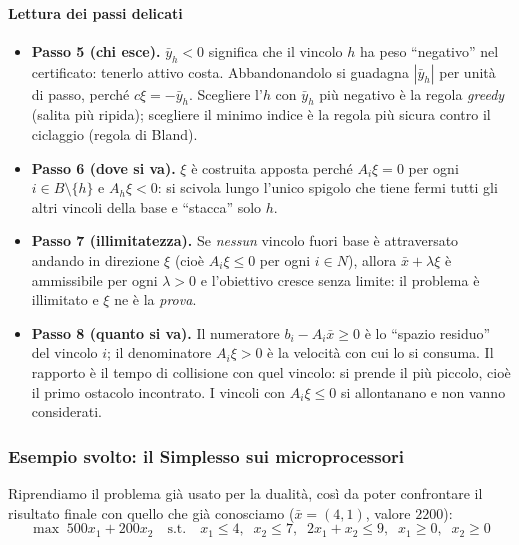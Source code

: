 \documentclass[12pt]{extarticle} %
\begin{document}
\paragraph{Lettura dei passi delicati}
\begin{itemize}
    \item \textbf{Passo 5 (chi esce).} $\bar{y}_h < 0$ significa che il vincolo $h$ ha peso ``negativo'' nel certificato: tenerlo attivo costa. Abbandonandolo si guadagna $|\bar{y}_h|$ per unità di passo, perché $c\xi = -\bar{y}_h$. Scegliere l'$h$ con $\bar{y}_h$ più negativo è la regola \emph{greedy} (salita più ripida); scegliere il minimo indice è la regola più sicura contro il ciclaggio (regola di Bland).
    \item \textbf{Passo 6 (dove si va).} $\xi$ è costruita apposta perché $A_i\xi = 0$ per ogni $i \in B\setminus\{h\}$ e $A_h\xi < 0$: si scivola lungo l'unico spigolo che tiene fermi tutti gli altri vincoli della base e ``stacca'' solo $h$.
    \item \textbf{Passo 7 (illimitatezza).} Se \emph{nessun} vincolo fuori base è attraversato andando in direzione $\xi$ (cioè $A_i\xi \le 0$ per ogni $i \in N$), allora $\bar{x} + \lambda\xi$ è ammissibile per ogni $\lambda > 0$ e l'obiettivo cresce senza limite: il problema è illimitato e $\xi$ ne è la \emph{prova}.
    \item \textbf{Passo 8 (quanto si va).} Il numeratore $b_i - A_i\bar{x} \ge 0$ è lo ``spazio residuo'' del vincolo $i$; il denominatore $A_i\xi > 0$ è la velocità con cui lo si consuma. Il rapporto è il tempo di collisione con quel vincolo: si prende il più piccolo, cioè il primo ostacolo incontrato. I vincoli con $A_i\xi \le 0$ si allontanano e non vanno considerati.
\end{itemize}

\subsubsection{Esempio svolto: il Simplesso sui microprocessori}
Riprendiamo il problema già usato per la dualità, così da poter confrontare il risultato finale con quello che già conosciamo ($\bar{x} = (4,1)$, valore $2200$):
\[
\max\; 500x_1 + 200x_2 \quad \text{s.t.} \quad x_1 \le 4,\;\; x_2 \le 7,\;\; 2x_1 + x_2 \le 9,\;\; x_1 \ge 0,\;\; x_2 \ge 0
\]
\end{document}
